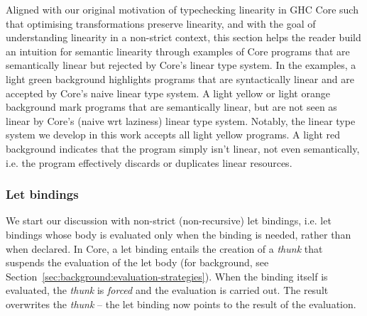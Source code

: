 \documentclass[acmsmall, screen, review]{acmart}
\newcommand{\workingcolorname}{light green}
\newcommand{\notyetcolorname}{light yellow}
\newcommand{\nowaycolorname}{light red}
\newcommand{\limitationcolorname}{light orange}
\begin{document}
Aligned with our original motivation of typechecking linearity in GHC Core such
that optimising transformations preserve linearity, and with the goal
of understanding linearity in a non-strict context, this section helps the
reader build an intuition for semantic linearity through examples of Core
programs that are semantically linear but rejected by Core's linear type
system.
%
In the examples, a \colorbox{working}{\workingcolorname} background highlights programs that are
syntactically linear and are accepted by Core's naive linear type system. A
\colorbox{notyet}{\notyetcolorname} or \colorbox{limitation}{\limitationcolorname} background mark programs that are
semantically linear, but are not seen as linear by Core's (naive wrt laziness) linear type
system. Notably, the linear type system we develop in this work accepts all
\colorbox{notyet}{\notyetcolorname} programs.
A \colorbox{noway}{\nowaycolorname} background indicates that the program
simply isn't linear, not even semantically, i.e. the program effectively
discards or duplicates linear resources.

\subsubsection{Let bindings}
We start our discussion with non-strict (non-recursive) let bindings, i.e. let bindings whose
body is evaluated only when the binding is needed, rather than when declared.
In Core, a let binding entails the creation of a \emph{thunk} that suspends the
evaluation of the let body (for background, see
Section~\ref{sec:background:evaluation-strategies}). When the binding itself is evaluated, the \emph{thunk} is
\emph{forced} and the evaluation is carried out. The result overwrites the
\emph{thunk} -- the let binding now points to the result of the evaluation.
\end{document}
